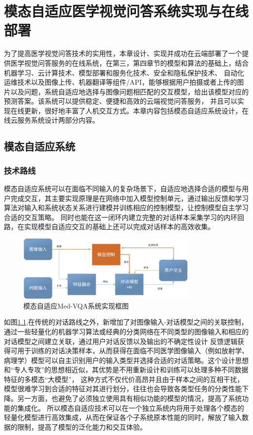 \chapter{模态自适应医学视觉问答系统实现与在线部署}
为了提高医学视觉问答技术的实用性，本章设计、实现并成功在云端部署了一个提供医学视觉问答服务的在线系统，在第三，第四章节的模型和算法的基础上，结合机器学习、云计算技术、模型部署和服务化技术、安全和隐私保护技术、
自动化运维技术以及图像上传、机器翻译等组件/API，能够根据用户拍摄或者上传的图片以及问题，系统自适应地选择与图像问题相匹配的交互模型，给出该模型对应的预测答案。该系统可以提供稳定、便捷和高效的云端视觉问答服务，
并且可以实现在线更新，很好地丰富了人机交互方式。本章内容包括模态自适应系统设计，在线云服务系统设计两部分内容。
%
\section{模态自适应系统}
\subsection{技术路线}
模态自适应系统可以在面临不同输入的复杂场景下，自适应地选择合适的模型与用户完成交互，其主要实现原理是在网络中加入模型控制单元，通过输出反馈和学习算法对输入和系统状态关系进行建模并训练相应的控制模型，让控制模型自主学习合适的交互策略。
同时也能在这一闭环内建立完整的对话样本采集学习的内环回路，在实现模型自适应交互的基础上还可以完成对话样本的高效收集。
\begin{figure}[htbp]
	\centering	
	\includegraphics[width=0.8\textwidth]{Fig/myfig/chapter5/sys_febroot.png}  %
	\caption{\label{sys_need}模态自适应Med-VQA系统实现框图} 
\end{figure}
如图\ref{sys_need},在传统的对话路线之外，新增加了对图像输入-对话模型之间的关联控制，通过一些轻量化的机器学习算法或经典的分类网络在不同类型的图像输入和相应的对话模型之间建立关联，通过用户对话反馈以及输出的不确定性设计
反馈逻辑获得可用于训练的对话决策样本，从而获得在面临不同医学图像输入（例如放射学、病理学）模型可以自主识别用户的输入类型并选择合适的对话策略。这个设计思想和“专人专攻”的思想相近似，其优势是不用重新设计和训练可以处理多种不同数据特征的多模态“大模型”，
这种方式不仅代价高昂并且由于样本之间的互相干扰，模型很难学习到合适的特征对其进行划分，往往也会导致各类型任务的分类性能下降。另一方面，也避免了必须独立使用具有相似功能的模型的情况，提高了系统功能的集成化。
所以模态自适应技术可以在一个独立系统内将用于处理各个模态的轻量化模型进行高效集成，从而在保证各个子系统原本性能的同时，解放了输入数据的限制，提高了模型的泛化能力和交互体验。


